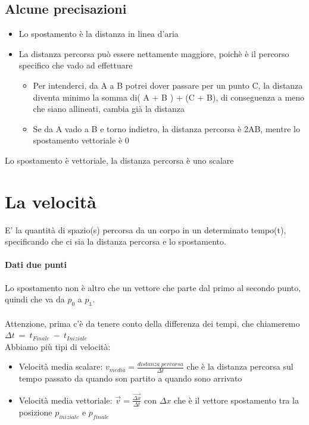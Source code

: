 \documentclass[12pt, a4paper, openany, oneside]{book}
\begin{document}
\subsection{Alcune precisazioni}
\begin{itemize}
	\item Lo spostamento è la distanza in linea d'aria
	\item La distanza percorsa può essere nettamente maggiore, poichè è il 
	percorso specifico che vado ad effettuare
	\begin{itemize}
		\item Per intenderci, da A a B potrei dover passare per un punto C, 
		la distanza diventa minimo la somma di( A + B ) + (C + B), di conseguenza
		a meno che siano allineati, cambia già la distanza
		\item Se da A vado a B e torno indietro, la distanza percorsa è 2AB, 
		mentre lo spostamento vettoriale è 0
	\end{itemize}
\end{itemize}
Lo spostamento è vettoriale, la distanza percorsa è uno scalare
\section{La velocità}
E' la quantità di spazio(s) percorsa da un corpo in un determinato tempo(t),
specificando che ci sia la distanza percorsa e lo spostamento.
\paragraph{Dati due punti} Lo spostamento non è altro che un vettore che parte
dal primo al secondo punto, quindi che va da $p_{0}$ a $p_{1}$.
\\ \\
Attenzione, prima c'è da tenere conto della differenza dei tempi, che chiameremo 
$\Delta t ~ = ~ t_{Finale} ~ - ~ t_{Iniziale}$
\\
Abbiamo più tipi di velocità:
\begin{itemize}
	\item {Velocità media scalare: $v_{media} = \frac{distanza~percorsa}{\Delta
	t}$ che è la distanza percorsa sul tempo passato da quando son partito a 
	quando sono arrivato }
	\item {Velocità media vettoriale: $\vec{v} = \frac{\vec{\Delta x}}
	{\Delta t}$ con $\Delta x$ che è il vettore spostamento tra la posizione 
	$p_{iniziale}$ e $p_{finale}$ }
\end{itemize}
\end{document}
